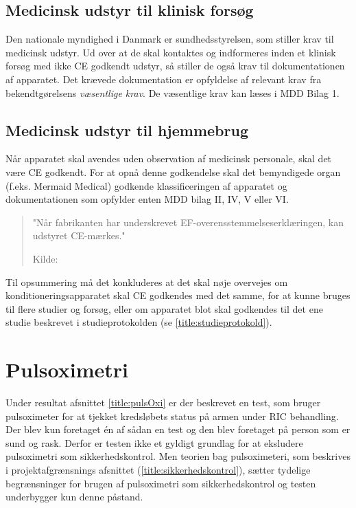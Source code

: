 \subsection{Medicinsk udstyr til klinisk forsøg}
Den nationale myndighed i Danmark er sundhedsstyrelsen, som stiller krav til medicinsk udstyr. Ud over at de skal kontaktes og indformeres inden et klinisk forsøg med ikke CE godkendt udstyr, så stiller de også krav til dokumentationen af apparatet. Det krævede dokumentation er opfyldelse af relevant krav fra bekendtgørelsens \textit{væsentlige krav}. De væsentlige krav kan læses i MDD Bilag 1.

\subsection{Medicinsk udstyr til hjemmebrug}
Når apparatet skal avendes uden observation af medicinsk personale, skal det være CE godkendt. For at opnå denne godkendelse skal det bemyndigede organ (f.eks. Mermaid Medical) godkende klassificeringen af apparatet og dokumentationen som opfylder enten MDD bilag II, IV, V eller VI. 

\begin{quote}
	"Når fabrikanten har underskrevet EF-overensstemmelseserklæringen, kan udstyret CE-mærkes."
	
	Kilde: 
\end{quote}

Til opsummering må det konkluderes at det skal nøje overvejes om konditioneringsapparatet skal CE godkendes med det samme, for at kunne bruges til flere studier og forsøg, eller om apparatet blot skal godkendes til det ene studie beskrevet i studieprotokolden (se \ref{title:studieprotokold}).



\section{Pulsoximetri}
Under resultat afsnittet \ref{title:pulsOxi} er der beskrevet en test, som bruger pulsoximeter for at tjekket kredsløbets status på armen under RIC behandling. Der blev kun foretaget én af sådan en test og den blev foretaget på person som er sund og rask. Derfor er testen ikke et gyldigt grundlag for at eksludere pulsoximetri som sikkerhedskontrol. Men teorien bag pulsoximeteri, som beskrives i projektafgrænsnings afsnittet (\ref{title:sikkerhedskontrol}), sætter tydelige begrænsninger for brugen af pulsoximetri som sikkerhedskontrol og testen underbygger kun denne påstand. 



